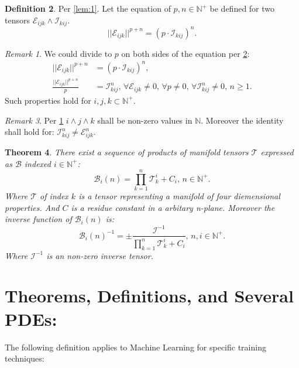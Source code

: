 \documentclass[10pt]{article}
\theoremstyle{plain}
\newtheorem{theorem}{Theorem}[section]
\theoremstyle{definition}
\newtheorem{definition}[theorem]{Definition}
\theoremstyle{remark}
\newtheorem{remark}[theorem]{Remark}
\begin{document}
\begin{definition}
\label{def:1}
Per \ref{lem:1}. Let the equation of $p, n \in \mathbb{N}^{+}$ be defined for two tensors $\mathcal{E}_{ijk} \land \mathcal{I}_{kij}$.
\begin{equation}
	||\mathcal{E}_{ijk}||^{p+n} = (p \cdot \mathcal{I}_{kij})^{n}.
\end{equation}
\begin{remark}
\label{rem:1}
We could divide to $p$ on both sides of the equation per \ref{def:1}:
\begin{align*}
	||\mathcal{E}_{ijk}||^{p+n} &= (p \cdot \mathcal{I}_{kij})^{n},\\
	\frac{||\mathcal{E}_{ijk}||^{p+n}}{p} &= \mathcal{I}_{kij}^{n}, \, \forall \mathcal{E}_{ijk} \neq 0, \, \forall p \neq 0, \, \forall \mathcal{I}_{kij}^n \neq 0, \, n \geq 1.
\end{align*}
Such properties hold for $i, j, k \subset \mathbb{N}^{+}$.
\end{remark}
\end{definition}
\begin{remark}
	Per \ref{rem:1} $i \land j \land k$ shall be non-zero values in $\mathbb{N}$. Moreover the identity shall hold for: $\mathcal{I}_{kij}^{n} \neq \mathcal{E}_{ijk}^{n}$.
\end{remark}

\begin{theorem}
There exist a sequence of products of manifold tensors $\mathcal{T}$ expressed as $\mathcal{B}$ indexed $i \in \mathbb{N}^{+}$:
\begin{equation}
	\mathcal{B}_{i}(n) = \prod_{k=1}^{n} \mathcal{T}_{k}^{i} + C_{i}, \, n \in \mathbb{N}^{+}.
\end{equation}
Where $\mathcal{T}$ of index $k$ is a tensor representing a manifold of four diemensional properties. And $C$ is a residue constant in a arbitary n-plane. Moreover the inverse function of $\mathcal{B}_{i}(n)$ is:
\begin{equation}
	\mathcal{B}_{i}(n)^{-1} = \pm \frac{\mathcal{I}^{-1}}{\prod_{k=1}^{n} \mathcal{T}_{k}^{i} + C_{i}}, \, n, i \in \mathbb{N}^{+}.
\end{equation}
Where $\mathcal{I}^{-1}$ is an non-zero inverse tensor.
\end{theorem}

\section{Theorems, Definitions, and Several PDEs:}
The following definition applies to Machine Learning for specific training techniques:
\end{document}
